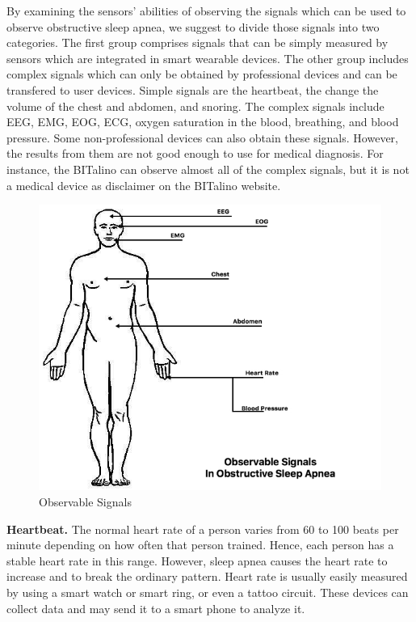     By examining the sensors' abilities of observing the signals which can be used to observe obstructive sleep apnea, we suggest to divide those signals into two categories. The first group comprises signals that can be simply measured by sensors which are integrated in smart wearable devices. The other group includes complex signals which can only be obtained by professional devices and can be transfered to user devices. Simple signals are the heartbeat, the change the volume of the chest and abdomen, and snoring. The complex signals include EEG, EMG, EOG, ECG, oxygen saturation in the blood, breathing, and blood pressure. Some non-professional devices can also obtain these signals. However, the results from them are not good enough to use for medical diagnosis. For instance, the BITalino can observe almost all of the complex signals, but it is not a medical device as disclaimer on the BITalino website.

    \begin{figure}[h]
        \centering
        \includegraphics[width=1.0\textwidth]{Figures/humanbody.jpg}
        \caption{Observable Signals \cite{Advan}}
        \label{fig:Figures/humanbody}
    \end{figure}

    
    \textbf{Heartbeat. } The normal heart rate of a person varies from 60 to 100 beats per minute \cite{HEARTORG_HR} depending on how often that person trained. Hence, each person has a stable heart rate in this range. However, sleep apnea causes the heart rate to increase and to break the ordinary pattern. Heart rate is usually easily measured by using a smart watch or smart ring, or even a tattoo circuit. These devices can collect data and may send it to a smart phone to analyze it.

